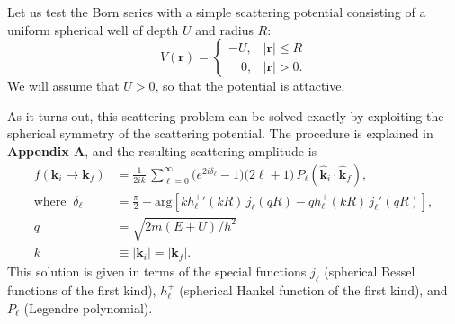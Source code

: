 \documentclass[pra,12pt]{revtex4-2}
\begin{document}
Let us test the Born series with a simple scattering potential
consisting of a uniform spherical well of depth $U$ and radius $R$:
\begin{equation}
  V(\mathbf{r}) = \begin{cases}-U, & |\mathbf{r}| \le R \\ \;\;\;\,0,
    & |\mathbf{r}| > 0. \end{cases}
\end{equation}
We will assume that $U > 0$, so that the potential is attactive.

As it turns out, this scattering problem can be solved exactly by
exploiting the spherical symmetry of the scattering potential.  The
procedure is explained in \textbf{Appendix A}, and the resulting
scattering amplitude is
\begin{equation}
  \begin{aligned}f(\mathbf{k}_i \rightarrow \mathbf{k}_f) &= \frac{1}{2ik}\, \sum_{\ell =0}^\infty \big(e^{2i\delta_\ell} - 1\big) \big(2\ell+1\big)\, P_{\ell}(\hat{\mathbf{k}}_i\cdot \hat{\mathbf{k}}_f), \\ \mathrm{where}\;\; \delta_\ell &= \frac{\pi}{2} + \mathrm{arg}\!\left[k {h_\ell^+}'(kR) \, j_\ell(qR) - qh_\ell^+(kR)\, j_\ell'(qR)\right], \\ q &= \sqrt{2m(E+U)/\hbar^2} \\ k &\equiv |\mathbf{k}_i| = |\mathbf{k}_f|.\end{aligned}
\end{equation}
This solution is given in terms of the special functions $j_\ell$
(spherical Bessel functions of the first kind), $h_\ell^+$ (spherical
Hankel function of the first kind), and $P_\ell$ (Legendre
polynomial).
\end{document}
